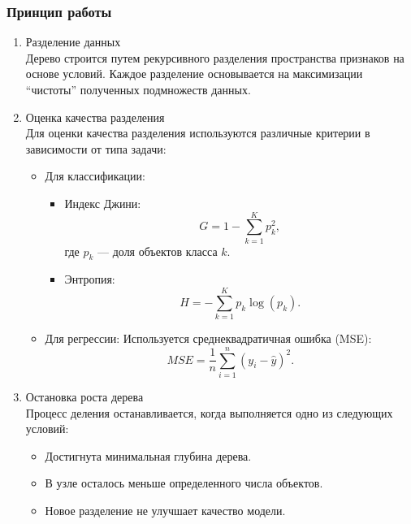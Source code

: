 \begin{enumerate}
\hypertarget{ux43fux440ux438ux43dux446ux438ux43f-ux440ux430ux431ux43eux442ux44b}{%
\subsubsection*{Принцип
работы}\label{ux43fux440ux438ux43dux446ux438ux43f-ux440ux430ux431ux43eux442ux44b}}

\begin{enumerate}[label=\arabic*., leftmargin=*]
    \item Разделение данных 
    \\
    Дерево строится путем рекурсивного разделения пространства признаков на основе условий. Каждое разделение основывается на максимизации ``чистоты'' полученных подмножеств данных.

    \item Оценка качества разделения  
    \\
    Для оценки качества разделения используются различные критерии в зависимости от типа задачи:
    
    \begin{itemize}[leftmargin=*]
        \item Для классификации:
        \begin{itemize}[leftmargin=*]
            \item Индекс Джини:  
            \[
            G = 1 - \sum_{k=1}^K p_k^2,
            \]  
            где \(p_k\) — доля объектов класса \(k\).
            
            \item Энтропия:  
            \[
            H = - \sum_{k=1}^K p_k \log(p_k).
            \]
        \end{itemize}
        
        \item Для регрессии:  
        Используется среднеквадратичная ошибка (MSE):  
        \[
        MSE = \frac{1}{n} \sum_{i=1}^n (y_i - \hat{y})^2.
        \]
    \end{itemize}

    \item Остановка роста дерева
    \\
    Процесс деления останавливается, когда выполняется одно из следующих условий:
    \begin{itemize}[leftmargin=*]
        \item Достигнута минимальная глубина дерева.
        \item В узле осталось меньше определенного числа объектов.
        \item Новое разделение не улучшает качество модели.
    \end{itemize}
\end{enumerate}



\end{enumerate}
